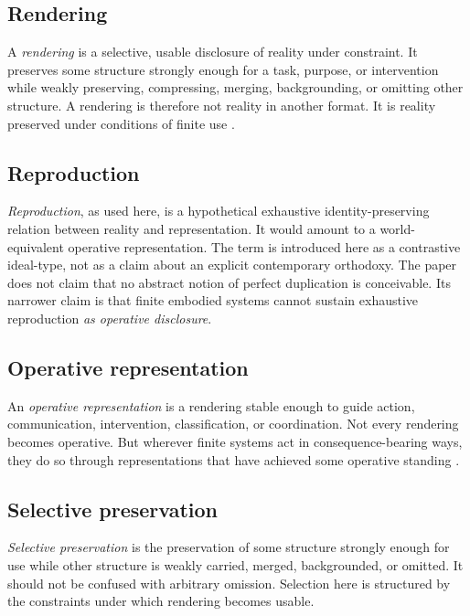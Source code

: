 \documentclass[11pt]{article}
\renewcommand{\emph}[1]{\textit{#1}}
\begin{document}
\subsection{Rendering}

A \emph{rendering} is a selective, usable disclosure of reality under constraint. It preserves some structure strongly enough for a task, purpose, or intervention while weakly preserving, compressing, merging, backgrounding, or omitting other structure. A rendering is therefore not reality in another format. It is reality preserved under conditions of finite use \cite{FriggNguyen2021ScientificRepresentationSEP,FriggHartmann2025ModelsScienceSEP}.

\subsection{Reproduction}

\emph{Reproduction}, as used here, is a hypothetical exhaustive identity-preserving relation between reality and representation. It would amount to a world-equivalent operative representation. The term is introduced here as a contrastive ideal-type, not as a claim about an explicit contemporary orthodoxy. The paper does not claim that no abstract notion of perfect duplication is conceivable. Its narrower claim is that finite embodied systems cannot sustain exhaustive reproduction \emph{as operative disclosure}.

\subsection{Operative representation}

An \emph{operative representation} is a rendering stable enough to guide action, communication, intervention, classification, or coordination. Not every rendering becomes operative. But wherever finite systems act in consequence-bearing ways, they do so through representations that have achieved some operative standing \cite{ConantAshby1970GoodRegulator,BowkerStar1999SortingThingsOut}.

\subsection{Selective preservation}

\emph{Selective preservation} is the preservation of some structure strongly enough for use while other structure is weakly carried, merged, backgrounded, or omitted. It should not be confused with arbitrary omission. Selection here is structured by the constraints under which rendering becomes usable.
\end{document}
